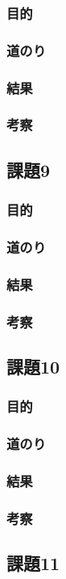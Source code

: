 \documentclass[a4paper]{jarticle}
\begin{document}
\subsubsection{目的}
\subsubsection{道のり}
\subsubsection{結果}
\subsubsection{考察}
\subsection{課題9}
\subsubsection{目的}
\subsubsection{道のり}
\subsubsection{結果}
\subsubsection{考察}
\subsection{課題10}
\subsubsection{目的}
\subsubsection{道のり}
\subsubsection{結果}
\subsubsection{考察}
\subsection{課題11}
\end{document}
